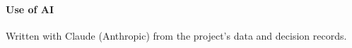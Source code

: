 \documentclass[sigplan]{acmart}
\begin{document}
\paragraph{Use of AI} Written with Claude (Anthropic) from the project's
data and decision records.



\end{document}

